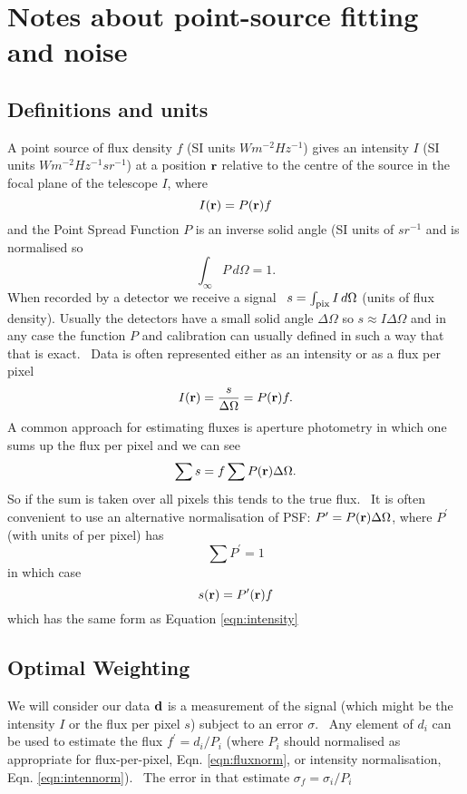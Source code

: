 \documentclass{article}
\begin{document}
\section{Notes about point-source fitting and noise}
\subsection{Definitions and units}
A point source of flux density $f$ (SI units $Wm^{-2}Hz^{-1}$) gives an intensity $I$ (SI units $Wm^{-2}Hz^{-1}sr^{-1}$) at a position ${\bf r}$ relative to the centre of the source in the focal plane of the telescope $I$, where 
\begin{equation} I({\bf r})=P({\bf r})f \label{eqn:intensity}\end{equation} and the Point Spread Function $P$ is an inverse solid angle (SI units of $sr^{-1}$ and is normalised so 
\begin{equation}\int_\infty P\, d\Omega=1.\label{eqn:intennorm}\end{equation}
When recorded by a detector we receive a signal  $s=\int_{\rm pix}{I}\,d\Omega$ (units of flux density). Usually the detectors have a small solid angle $\Delta\Omega$ so $s\approx I\Delta\Omega$ and in any case the function $P$ and calibration can usually defined in such a way that that is exact.  Data is often represented either as an intensity or as a flux per pixel
\begin{equation}
I({\bf r})=\frac{s}{\Delta{\Omega}}=P({\bf r})f.
\end{equation}
A common approach for estimating fluxes is aperture photometry in which one sums up the flux per pixel and we can see
\begin{equation}
\sum{s}=f\sum{P({\bf r})\Delta{\Omega}}.
\end{equation}
So if the sum is taken over all pixels this tends to the true flux.  It is often convenient to use an alternative normalisation of PSF:
$P^\prime=P({\bf r})\Delta{\Omega}$, where $P^\prime$ (with units of per pixel) has
\begin{equation}\sum P^\prime=1\label{eqn:fluxnorm}\end{equation} in which case 
\begin{equation}s({\bf r})=P^\prime({\bf r}) f\label{eqn:pix}\end{equation}
which has the same form as Equation \ref{eqn:intensity}

\subsection{Optimal Weighting}
We will consider our data ${\bf d}$ is a measurement of the signal (which might be the intensity $I$ or the flux per pixel $s$) subject to an error $\sigma$.  Any element of $d_i$ can be used to estimate the flux $f^\prime=d_i/P_i$ (where $P_i$ should normalised as appropriate for flux-per-pixel, Eqn. \ref{eqn:fluxnorm}, or intensity normalisation, Eqn. \ref{eqn:intennorm}).  The error in that estimate $\sigma_f=\sigma_i/P_i$
\end{document}
